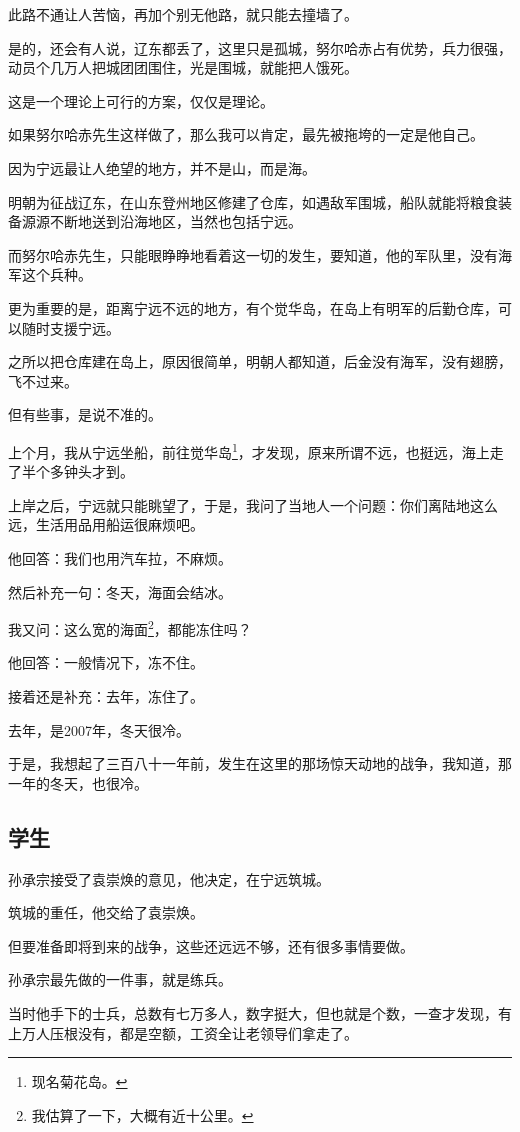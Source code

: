 \begin{multicols}{\theparacolNo}
此路不通让人苦恼，再加个别无他路，就只能去撞墙了。

是的，还会有人说，辽东都丢了，这里只是孤城，努尔哈赤占有优势，兵力很强，动员个几万人把城团团围住，光是围城，就能把人饿死。

这是一个理论上可行的方案，仅仅是理论。

如果努尔哈赤先生这样做了，那么我可以肯定，最先被拖垮的一定是他自己。

因为宁远最让人绝望的地方，并不是山，而是海。

明朝为征战辽东，在山东登州地区修建了仓库，如遇敌军围城，船队就能将粮食装备源源不断地送到沿海地区，当然也包括宁远。

而努尔哈赤先生，只能眼睁睁地看着这一切的发生，要知道，他的军队里，没有海军这个兵种。

更为重要的是，距离宁远不远的地方，有个觉华岛，在岛上有明军的后勤仓库，可以随时支援宁远。

之所以把仓库建在岛上，原因很简单，明朝人都知道，后金没有海军，没有翅膀，飞不过来。

但有些事，是说不准的。

上个月，我从宁远坐船，前往觉华岛\footnote{现名菊花岛。}，才发现，原来所谓不远，也挺远，海上走了半个多钟头才到。

上岸之后，宁远就只能眺望了，于是，我问了当地人一个问题：你们离陆地这么远，生活用品用船运很麻烦吧。

他回答：我们也用汽车拉，不麻烦。

然后补充一句：冬天，海面会结冰。

我又问：这么宽的海面\footnote{我估算了一下，大概有近十公里。}，都能冻住吗？

他回答：一般情况下，冻不住。

接着还是补充：去年，冻住了。

去年，是2007年，冬天很冷。

于是，我想起了三百八十一年前，发生在这里的那场惊天动地的战争，我知道，那一年的冬天，也很冷。

\subsection{学生}
孙承宗接受了袁崇焕的意见，他决定，在宁远筑城。

筑城的重任，他交给了袁崇焕。

但要准备即将到来的战争，这些还远远不够，还有很多事情要做。

孙承宗最先做的一件事，就是练兵。

当时他手下的士兵，总数有七万多人，数字挺大，但也就是个数，一查才发现，有上万人压根没有，都是空额，工资全让老领导们拿走了。


\end{multicols}
